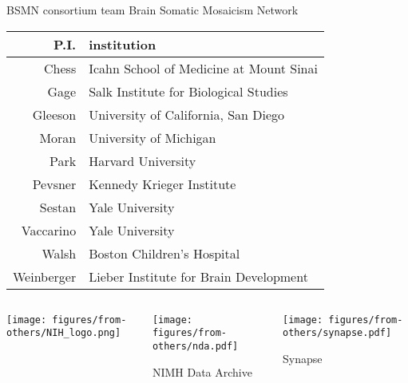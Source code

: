\documentclass{beamer}
\begin{document}
\begin{frame}{BSMN consortium team}
Brain Somatic Mosaicism Network
\footnotesize
\begin{tabular}{rl}
\hline
P.I. & institution \\
\hline
Chess & Icahn School of Medicine at Mount Sinai\\
Gage & Salk Institute for Biological Studies\\
Gleeson & University of California, San Diego\\
Moran & University of Michigan\\
Park & Harvard University\\
Pevsner & Kennedy Krieger Institute\\
Sestan & Yale University\\
Vaccarino & Yale University\\
Walsh & Boston Children's Hospital\\
Weinberger & Lieber Institute for Brain Development\\
\end{tabular}
\vfill
\begin{columns}[t]
\begin{column}{0.3\textwidth}
\begin{center}

\texttt{[image: figures/from-others/NIH\_logo.png]}
\end{center}
\end{column}

\begin{column}{0.3\textwidth}
\begin{center}

\texttt{[image: figures/from-others/nda.pdf]}

NIMH Data Archive
\end{center}
\end{column}

\begin{column}{0.3\textwidth}
\begin{center}

\texttt{[image: figures/from-others/synapse.pdf]}

Synapse
\end{center}
\end{column}
\end{columns}
\end{frame}
\end{document}
